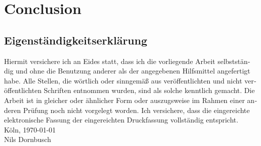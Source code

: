 \documentclass[12pt,a4paper,twoside, open=right]{scrreprt}
\theoremstyle{definition}
\theoremstyle{plain}
\begin{document}
\chapter{Conclusion}

\setcounter{lofdepth}{2}
\listoffigures
\newpage
{}

{}
\newpage
\begin{otherlanguage}{ngerman}
\chapter*{Eigenständigkeitserklärung}
Hiermit versichere ich an Eides statt, dass ich die vorliegende Arbeit selbstständig und ohne die Benutzung anderer als der angegebenen  Hilfsmittel  angefertigt  habe.  
Alle  Stellen,  die  wörtlich  oder  sinngemäß  aus  veröffentlichten  und  nicht  veröffentlichten  Schriften  entnommen  wurden,  sind  als  solche  kenntlich  gemacht.  
Die  Arbeit  ist  in  gleicher  oder  ähnlicher  Form  oder  auszugsweise  im  Rahmen  einer  anderen  Prüfung  noch  nicht  vorgelegt  worden. 
Ich  versichere,  dass  die  eingereichte    elektronische    Fassung    der    eingereichten    Druckfassung    vollständig    entspricht.
\\[\bigskipamount]
Köln, \today
\\[2\bigskipamount]
Nils Dornbusch
\end{otherlanguage}
\end{document}
